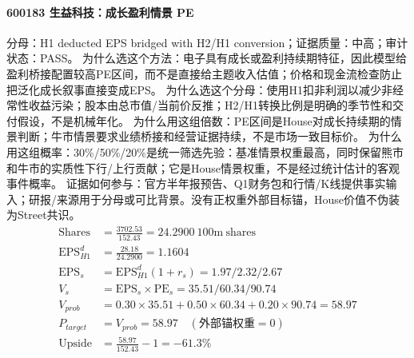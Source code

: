 \paragraph{600183 生益科技：成长盈利情景 PE}
分母：H1 deducted EPS bridged with H2/H1 conversion；证据质量：中高；审计状态：PASS。
为什么选这个方法：电子具有成长或盈利持续期特征，因此模型给盈利桥接配置较高PE区间，而不是直接给主题收入估值；价格和现金流检查防止把泛化成长叙事直接变成EPS。
为什么选这个分母：使用H1扣非利润以减少非经常性收益污染；股本由总市值/当前价反推；H2/H1转换比例是明确的季节性和交付假设，不是机械年化。
为什么用这组倍数：PE区间是House对成长持续期的情景判断；牛市情景要求业绩桥接和经营证据持续，不是市场一致目标价。
为什么用这组概率：30\%/50\%/20\%是统一筛选先验：基准情景权重最高，同时保留熊市和牛市的实质性下行/上行贡献；它是House情景权重，不是经过统计估计的客观事件概率。
证据如何参与：官方半年报预告、Q1财务包和行情/K线提供事实输入；研报/来源用于分母或可比背景。没有正权重外部目标锚，House价值不伪装为Street共识。
\begin{align*}
\mathrm{Shares} &= \frac{3702.53}{152.43}=24.2900\ \mathrm{100m\ shares}\\
\mathrm{EPS}_{H1}^d &= \frac{28.18}{24.2900}=1.1604\\
\mathrm{EPS}_s &= \mathrm{EPS}_{H1}^d(1+r_s)=1.97/2.32/2.67\\
V_s &= \mathrm{EPS}_s\times \mathrm{PE}_s=35.51/60.34/90.74\\
V_{prob} &= 0.30\times 35.51+0.50\times 60.34+0.20\times 90.74=58.97\\
P_{target} &= V_{prob}=58.97\quad(\text{外部锚权重}=0)\\
\mathrm{Upside} &= \frac{58.97}{152.43}-1=-61.3\%\\
\end{align*}

